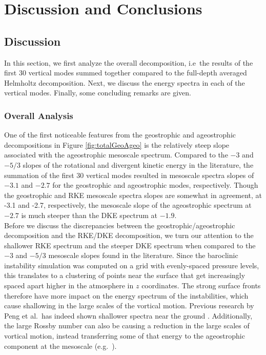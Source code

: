 \chapter{Discussion and Conclusions}
\label{ch:ch5}

\section{Discussion}
In this section, we first analyze the overall decomposition, i.e\ the results of the first 30 vertical modes summed together compared to the full-depth averaged Helmholtz decomposition. Next, we discuss the energy spectra in each of the vertical modes. Finally, some concluding remarks are given.

\subsection{Overall Analysis}
One of the first noticeable features from the geostrophic and ageostrophic decompositions in Figure \ref{fig:totalGeoAgeo} is the relatively steep slope associated with the ageostrophic mesoscale spectrum. Compared to the $-3$ and $-5/3$ slopes of the rotational and divergent kinetic energy in the literature, the summation of the first 30 vertical modes resulted in mesoscale spectra slopes of $-3.1$ and $-2.7$ for the geostrophic and ageostrophic modes, respectively. Though the geostrophic and RKE mesoscale spectra slopes are somewhat in agreement, at -3.1 and -2.7, respectively, the mesoscale slope of the ageostrophic spectrum at $-2.7$ is much steeper than the DKE spectrum at $-1.9$.\\

Before we discuss the discrepancies between the geostrophic/ageostrophic decomposition and the RKE/DKE decomposition, we turn our attention to the shallower RKE spectrum and the steeper DKE spectrum when compared to the $-3$ and $-5/3$ mesoscale slopes found in the literature. Since the baroclinic instability simulation was computed on a grid with evenly-spaced pressure levels, this translates to a clustering of points near the surface that get increasingly spaced apart higher in the atmosphere in $z$ coordinates. The strong surface fronts therefore have more impact on the energy spectrum of the instabilities, which cause shallowing in the large scales of the vortical motion. Previous research by Peng et al.\ has indeed shown shallower spectra near the ground \cite{Peng2013}. Additionally, the large Rossby number can also be causing a reduction in the large scales of vortical motion, instead transferring some of that energy to the ageostrophic component at the mesoscale (e.g.\ \cite{Bartello2010}).\\

